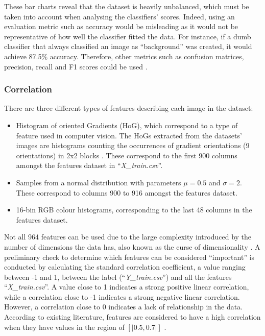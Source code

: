 \documentclass[letterpaper,12pt]{article}
\begin{document}
These bar charts reveal that the dataset is heavily unbalanced, which must be taken into account when analysing the classifiers' scores. Indeed, using an  evaluation metric such as accuracy would be misleading as it would not be representative of how well the classifier fitted the data. For instance, if a dumb classifier that always classified an image as ``background'' was created, it would achieve 87.5\% accuracy. Therefore, other metrics such as confusion matrices, precision, recall and F1 scores could be used \cite{Geron2019}.

\subsubsection{Correlation}

There are three different types of features describing each image in the dataset:
\begin{itemize}
    \item Histogram of oriented Gradients (HoG), which correspond to a type of feature used in computer vision. The HoGs extracted from the datasets' images are histograms counting the occurrences of gradient orientations (9 orientations) in 2x2 blocks \cite{Dalal2005}. These correspond to the first 900 columns amongst the features dataset  in ``\textit{X\_train.csv}''.
    \item Samples from a normal distribution with parameters $\mu=0.5$ and $\sigma=2$. These correspond to columns 900 to 916 amongst the features dataset.
    \item 16-bin RGB colour histograms, corresponding to the last 48 columns in the features dataset.
\end{itemize}

Not all 964 features can be used due to the large complexity introduced by the number of dimensions the data has, also known as the curse of dimensionality \cite{Geron2019}. A preliminary check to determine which features can be considered ``important'' is conducted by calculating the standard correlation coefficient, a value ranging between -1 and 1, between the label (``\textit{Y\_train.csv}'') and all the features ``\textit{X\_train.csv}''. A value close to 1 indicates a strong positive linear correlation, while a correlation close to -1 indicates a strong negative linear correlation. However, a correlation close to 0 indicates a lack of relationship in the data. According to existing literature, features are considered to have a high correlation when they have values in the region of $[|0.5,0.7|]$ \cite{Geron2019} \cite{Badr2019}.\\
\end{document}
